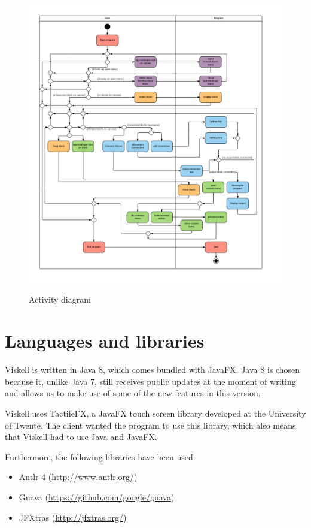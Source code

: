 \begin{figure}[p]
	\centering
	\includegraphics[width=\textwidth]{Images/activitydiagram}
	\label{fig:activitydiagram}
	\caption{Activity diagram}
\end{figure}

\section{Languages and libraries}
Viskell is written in Java 8, which comes bundled with JavaFX. 
Java 8 is chosen because it, unlike Java 7, still receives public updates at the moment of writing and allows us to make use of some of the new features in this version.

Viskell uses TactileFX, a JavaFX touch screen library developed at the University of Twente.
The client wanted the program to use this library, which also means that Viskell had to use Java and JavaFX.

Furthermore, the following libraries have been used:

\begin{itemize}
	\item Antlr 4 (\url{http://www.antlr.org/})
	\item Guava (\url{https://github.com/google/guava})
	\item JFXtras (\url{http://jfxtras.org/})
\end{itemize}

